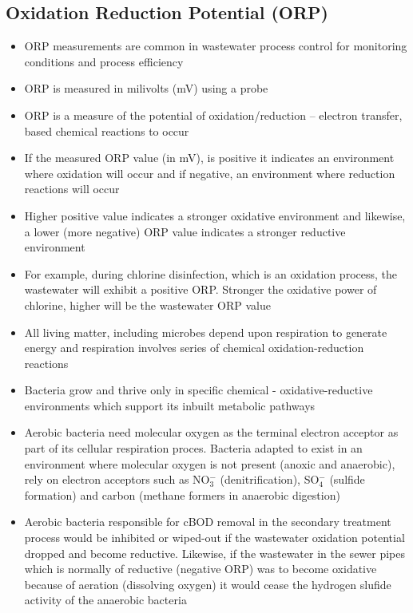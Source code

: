 \subsection{Oxidation Reduction Potential (ORP)}			
			\begin{itemize}
				\item ORP measurements are common in wastewater process control for monitoring conditions and process efficiency
				\item ORP is measured in milivolts (mV) using a probe\\
				\item ORP is a measure of the potential of oxidation/reduction – electron transfer, based chemical reactions to occur 
				\item If the measured ORP value (in mV), is positive it indicates an environment where oxidation will occur and if negative, an environment where reduction reactions will occur
				\item Higher positive value indicates a stronger oxidative environment and likewise, a lower (more negative) ORP value indicates a stronger reductive environment 
				\item For example, during chlorine disinfection, which is an oxidation process, the wastewater will exhibit a positive ORP.  Stronger the oxidative power of chlorine, higher will be the wastewater ORP value
				\item All living matter, including microbes depend upon respiration to generate energy and respiration involves series of chemical oxidation-reduction reactions 
				\item Bacteria grow and thrive only in specific chemical - oxidative-reductive environments which support its inbuilt metabolic pathways
				\item Aerobic bacteria need molecular oxygen as the terminal electron acceptor as part of its cellular respiration proces.  Bacteria adapted to exist in an environment where molecular oxygen is not present (anoxic and anaerobic), rely on electron acceptors such as NO$_3^-$ (denitrification), SO$_4^-$ (sulfide formation) and carbon (methane formers in anaerobic digestion)
				\item Aerobic bacteria responsible for cBOD removal in the secondary treatment process would be inhibited or wiped-out if the wastewater oxidation potential dropped and become reductive.  Likewise, if the wastewater in the sewer pipes which is normally of reductive (negative ORP)  was to become oxidative because of aeration (dissolving oxygen) it would cease the hydrogen slufide activity of the anaerobic bacteria
				\end{itemize}
		
